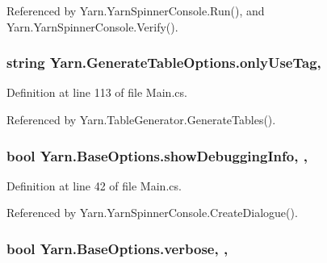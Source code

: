Referenced by Yarn.\-Yarn\-Spinner\-Console.\-Run(), and Yarn.\-Yarn\-Spinner\-Console.\-Verify().

\hypertarget{a00102_a8b30c1b7fb1b74eae455a568c1024b3d}{
\subsubsection[{only\-Use\-Tag}]{\setlength{\rightskip}{0pt plus 5cm}string Yarn.\-Generate\-Table\-Options.\-only\-Use\-Tag\hspace{0.3cm}{\ttfamily [get]}, {\ttfamily [set]}}}\label{a00102_a8b30c1b7fb1b74eae455a568c1024b3d}


Definition at line 113 of file Main.\-cs.



Referenced by Yarn.\-Table\-Generator.\-Generate\-Tables().

\hypertarget{a00040_a89964ea17bd19caf00cb5bff563ed01c}{
\subsubsection[{show\-Debugging\-Info}]{\setlength{\rightskip}{0pt plus 5cm}bool Yarn.\-Base\-Options.\-show\-Debugging\-Info\hspace{0.3cm}{\ttfamily [get]}, {\ttfamily [set]}, {\ttfamily [inherited]}}}\label{a00040_a89964ea17bd19caf00cb5bff563ed01c}


Definition at line 42 of file Main.\-cs.



Referenced by Yarn.\-Yarn\-Spinner\-Console.\-Create\-Dialogue().

\hypertarget{a00040_ada4d83d1756918f362d55f6649b82b17}{
\subsubsection[{verbose}]{\setlength{\rightskip}{0pt plus 5cm}bool Yarn.\-Base\-Options.\-verbose\hspace{0.3cm}{\ttfamily [get]}, {\ttfamily [set]}, {\ttfamily [inherited]}}}\label{a00040_ada4d83d1756918f362d55f6649b82b17}


